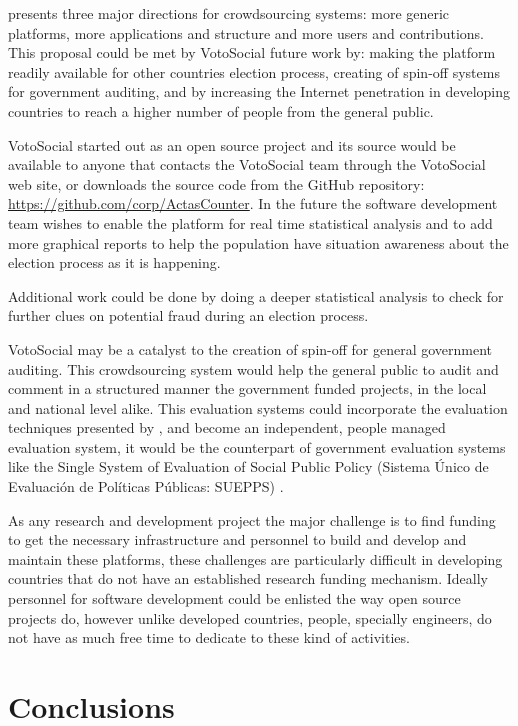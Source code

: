 \documentclass[letterpaper,10pt]{article}
\begin{document}
\cite{doan2011} presents three major directions for crowdsourcing systems: more generic platforms, more applications and structure and more users and contributions. This proposal could be met by VotoSocial future work by: making the platform readily available for other countries election process, creating of spin-off systems for government auditing, and by increasing the Internet penetration in developing countries to reach a higher number of people from the general public.

VotoSocial started out as an open source project and its source would be available to anyone that contacts the VotoSocial team through the VotoSocial web site, or downloads the source code from the GitHub repository: \url{https://github.com/corp/ActasCounter}. In the future the software development team wishes to enable the platform for real time statistical analysis and to add more graphical reports to help the population have situation awareness about the election process as it is happening.

Additional work could be done by doing a deeper statistical analysis to check for further clues on potential fraud during an election process.

VotoSocial may be a catalyst to the creation of spin-off for general government auditing. This crowdsourcing system would help the general public to audit and comment in a structured manner the government funded projects, in the local and national level alike. This evaluation systems could incorporate the evaluation techniques presented by \citep{morra2009}, and become an independent, people managed evaluation system, it would be the counterpart of government evaluation systems like the Single System of Evaluation of Social Public Policy (Sistema \'{U}nico de Evaluaci\'{o}n de Pol\'{i}ticas P\'{u}blicas: SUEPPS) \cite{arias2014}.

As any research and development project the major challenge is to find funding to get the necessary infrastructure and personnel to build and develop and maintain these platforms, these challenges are particularly difficult in developing countries that do not have an established research funding mechanism. Ideally personnel for software development could be enlisted the way open source projects do, however unlike developed countries, people, specially engineers, do not have as much free time to dedicate to these kind of activities.


\section{Conclusions}
\end{document}
